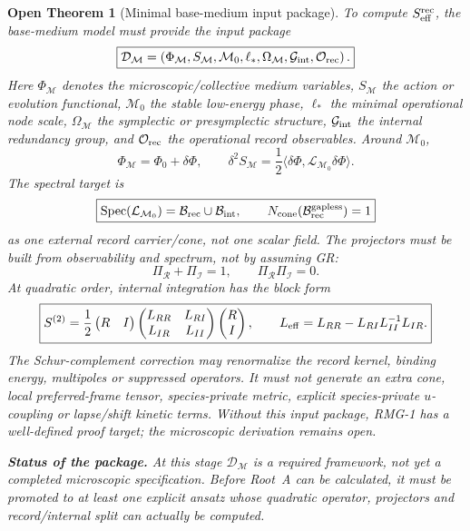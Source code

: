 \documentclass[11pt]{article}
\newtheorem{openthm}{Open Theorem}
\begin{document}
\begin{openthm}[Minimal base-medium input package]
To compute \(S_{\rm eff}^{\rm rec}\), the base-medium model must provide the
input package
\[
\boxed{
\mathcal D_{\mathcal M}
=
\left(
\Phi_{\mathcal M},
S_{\mathcal M},
\mathcal M_0,
\ell_*,
\Omega_{\mathcal M},
\mathcal G_{\rm int},
\mathcal O_{\rm rec}
\right).
}
\]
Here \(\Phi_{\mathcal M}\) denotes the microscopic/collective medium variables,
\(S_{\mathcal M}\) the action or evolution functional, \(\mathcal M_0\) the
stable low-energy phase, \(\ell_*\) the minimal operational node scale,
\(\Omega_{\mathcal M}\) the symplectic or
presymplectic structure, \(\mathcal G_{\rm int}\) the internal redundancy
group, and \(\mathcal O_{\rm rec}\) the operational record observables.  Around
\(\mathcal M_0\),
\[
\boxed{
\Phi_{\mathcal M}=\Phi_0+\delta\Phi,
\qquad
\delta^2S_{\mathcal M}
=
\frac12
\langle\delta\Phi,\mathcal L_{\mathcal M_0}\delta\Phi\rangle.
}
\]
The spectral target is
\[
\boxed{
\mathrm{Spec}(\mathcal L_{\mathcal M_0})
=
\mathcal B_{\rm rec}\cup\mathcal B_{\rm int},
\qquad
N_{\rm cone}(\mathcal B_{\rm rec}^{\rm gapless})=1
}
\]
as one external record carrier/cone, not one scalar field.  The projectors must be built from
observability and spectrum, not by assuming GR:
\[
\boxed{
\Pi_{\mathcal R}+\Pi_{\mathcal I}=1,
\qquad
\Pi_{\mathcal R}\Pi_{\mathcal I}=0.
}
\]
At quadratic order, internal integration has the block form
\[
\boxed{
S^{(2)}
=
\frac12
\begin{pmatrix}R&I\end{pmatrix}
\begin{pmatrix}
L_{RR} & L_{RI}\\
L_{IR} & L_{II}
\end{pmatrix}
\begin{pmatrix}R\\I\end{pmatrix},
\qquad
L_{\rm eff}=L_{RR}-L_{RI}L_{II}^{-1}L_{IR}.
}
\]
The Schur-complement correction may renormalize the record kernel, binding
energy, multipoles or suppressed operators.  It must not generate an extra
cone, local preferred-frame tensor, species-private metric, explicit
species-private \(u\)-coupling or lapse/shift kinetic terms.  Without this
input package, RMG-1 has a well-defined proof target; the microscopic
derivation remains open.

\medskip\noindent\textbf{Status of the package.}
At this stage \(\mathcal D_{\mathcal M}\) is a required framework, not yet a
completed microscopic specification.  Before Root~A can be calculated, it must
be promoted to at least one explicit ansatz whose quadratic operator,
projectors and record/internal split can actually be computed.


\end{openthm}
\end{document}
